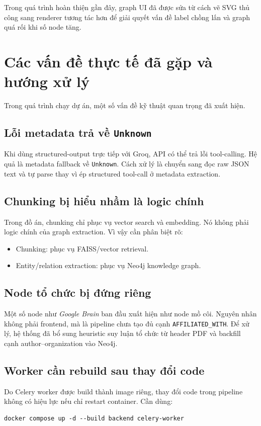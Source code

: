 \documentclass[12pt,a4paper]{article}
\begin{document}
Trong quá trình hoàn thiện gần đây, graph UI đã được sửa từ cách vẽ SVG thủ công sang renderer tương tác hơn để giải quyết vấn đề label chồng lấn và graph quá rối khi số node tăng.

\section{Các vấn đề thực tế đã gặp và hướng xử lý}
Trong quá trình chạy dự án, một số vấn đề kỹ thuật quan trọng đã xuất hiện.

\subsection{Lỗi metadata trả về \texttt{Unknown}}
Khi dùng structured-output trực tiếp với Groq, API có thể trả lỗi tool-calling. Hệ quả là metadata fallback về \texttt{Unknown}. Cách xử lý là chuyển sang đọc raw JSON text và tự parse thay vì ép structured tool-call ở metadata extraction.

\subsection{Chunking bị hiểu nhầm là logic chính}
Trong đồ án, chunking chỉ phục vụ vector search và embedding. Nó không phải logic chính của graph extraction. Vì vậy cần phân biệt rõ:
\begin{itemize}[leftmargin=1.6em]
  \item Chunking: phục vụ FAISS/vector retrieval.
  \item Entity/relation extraction: phục vụ Neo4j knowledge graph.
\end{itemize}

\subsection{Node tổ chức bị đứng riêng}
Một số node như \textit{Google Brain} ban đầu xuất hiện như node mồ côi. Nguyên nhân không phải frontend, mà là pipeline chưa tạo đủ cạnh \texttt{AFFILIATED\_WITH}. Để xử lý, hệ thống đã bổ sung heuristic suy luận tổ chức từ header PDF và backfill cạnh author--organization vào Neo4j.

\subsection{Worker cần rebuild sau thay đổi code}
Do Celery worker được build thành image riêng, thay đổi code trong pipeline không có hiệu lực nếu chỉ restart container. Cần dùng:
\begin{lstlisting}[style=codeblock]
docker compose up -d --build backend celery-worker
\end{lstlisting}
\end{document}
